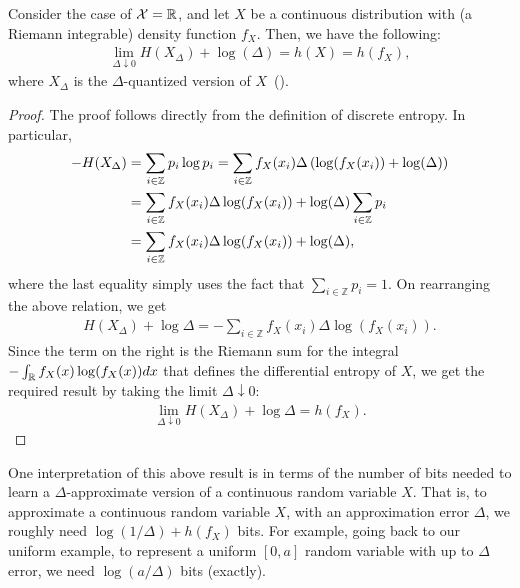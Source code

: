             \begin{theorem}
                \label{thm:quantized-entropy} Consider the case of $\mathcal{X} = \mathbb{R}$, and let $X$ be a continuous distribution with (a Riemann integrable) density function $f_X$. 
                Then, we have the following: 
                \begin{align}
                    \lim_{\Delta \downarrow 0} H(X_\Delta) + \log(\Delta) = h(X) = h(f_X), 
                \end{align}
                where $X_\Delta$ is the $\Delta$-quantized version of $X$~(). 
            \end{theorem}
            \begin{proof}
                The proof follows directly from the definition of discrete entropy. In particular, 
                \begin{align}
                    -H(X_\Delta) &= \sum_{i \in \mathbb{Z}} p_i \log p_i = \sum_{i\in \mathbb{Z}} f_X(x_i) \Delta \left( \log (f_X(x_i)) + \log(\Delta) \right) \\
                    & = \sum_{i\in \mathbb{Z}} f_X(x_i) \Delta \log (f_X(x_i)) + \log(\Delta)\sum_{i \in \mathbb{Z}} p_i\\
                    & =  \sum_{i\in \mathbb{Z}} f_X(x_i) \Delta \log (f_X(x_i))  + \log(\Delta), 
                \end{align}
                where the last equality simply uses the fact that $\sum_{i \in \mathbb{Z}} p_i = 1$. On rearranging the above relation, we get 
                \begin{align}
                    H(X_\Delta) + \log \Delta =  -\sum_{i\in \mathbb{Z}} f_X(x_i) \Delta \log (f_X(x_i)).   
                \end{align}
                Since the term on the right is the Riemann sum for the integral $-\int_{\mathbb{R}} f_X(x) \log(f_X(x)) dx$ that defines the differential entropy of $X$, we get the required result by taking the limit $\Delta \downarrow 0$: 
                \begin{align}
                     \lim_{\Delta \downarrow 0} H(X_\Delta) + \log \Delta =  h(f_X). 
                \end{align}
            \end{proof}

            \begin{remark}
                \label{remark:quantized-entropy-1}
                One interpretation of this above result is in terms of the number of bits needed to learn a $\Delta$-approximate version of a continuous random variable $X$. That is, to approximate a continuous random variable $X$, with an approximation error $\Delta$, we roughly need $\log(1/\Delta) + h(f_X)$ bits. For example, going back to our uniform example, to represent a uniform $[0,a]$ random variable with up to $\Delta$ error, we need $\log(a/\Delta)$ bits (exactly). 
            \end{remark}

